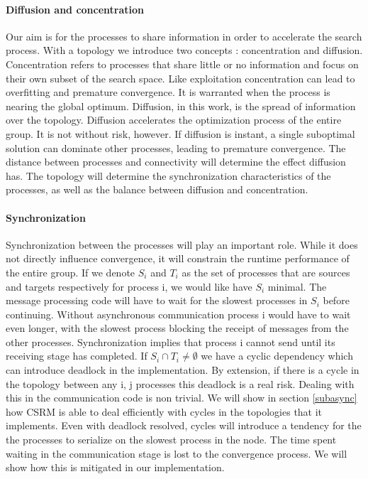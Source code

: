 \paragraph{Diffusion and concentration}
Our aim is for the processes to share information in order to accelerate the search process. With a topology we introduce two concepts : concentration and diffusion. Concentration refers to processes that share little or no information and focus on their own subset of the search space. Like exploitation concentration can lead to overfitting and premature convergence. It is warranted when the process is nearing the global optimum. Diffusion, in this work, is the spread of information over the topology. Diffusion accelerates the optimization process of the entire group. It is not without risk, however. If diffusion is instant, a single suboptimal solution can dominate other processes, leading to premature convergence. The distance between processes and connectivity will determine the effect diffusion has.
The topology will determine the synchronization characteristics of the processes, as well as the balance between diffusion and concentration.

\paragraph{Synchronization}
Synchronization between the processes will play an important role. While it does not directly influence convergence, it will constrain the runtime performance of the entire group. If we denote $S_i$ and $T_i$ as the set of processes that are sources and targets respectively for process i, we would like have $S_i$ minimal. The message processing code will have to wait for the slowest processes in $S_i$ before continuing. Without asynchronous communication process i would have to wait even longer, with the slowest process blocking the receipt of messages from the other processes. Synchronization implies that process i cannot send until its receiving stage has completed. If $S_i \cap T_i \neq \emptyset$ we have a cyclic dependency which can introduce deadlock in the implementation. By extension, if there is a cycle in the topology between any i, j processes this deadlock is a real risk. Dealing with this in the communication code is non trivial. We will show in section \ref{subasync} how CSRM is able to deal efficiently with cycles in the topologies that it implements. Even with deadlock resolved, cycles will introduce a tendency for the the processes to serialize on the slowest process in the node. The time spent waiting in the communication stage is lost to the convergence process. We will show how this is mitigated in our implementation.

